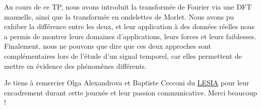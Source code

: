 \documentclass[11pt]{article}
\begin{document}
Au cours de ce TP, nous avons introduit la transformée de Fourier via
une DFT manuelle, ainsi que la transformée en ondelettes de Morlet. Nous
avons pu exhiber la différence entre les deux, et leur application à des
données réelles nous a permis de montrer leurs domaines d'applications,
leurs forces et leurs faiblesses. Finalement, nous ne pouvons que dire
que ces deux approches sont complémentaires lors de l'étude d'un signal
temporel, car elles permettent de mettre en évidence des phénomènes
différents.

Je tiens à remercier Olga Alexandrova et Baptiste Cecconi du
\href{http://lesia.obspm.fr/}{LESIA} pour leur encadrement durant cette
journée et leur passion communicative. Merci beaucoup !


    
    
    
    
\end{document}
